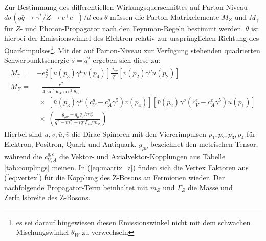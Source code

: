 Zur Bestimmung des differentiellen Wirkungsquerschnittes auf Parton-Niveau
\linebreak
\mbox{$d\sigma(q\bar q \rightarrow \gamma^*/Z \rightarrow e^+e^-)/d\cos\theta$}
müssen die Parton-Matrixelemente $M_Z$ und $M_\gamma$ für $Z$- und
Photon-Propagator nach den Feynman-Regeln bestimmt werden. $\theta$ ist hierbei
der Emissionswinkel des Elektron relativ zur ursprünglichen Richtung des
Quarkimpulses\footnote{es sei darauf hingewiesen diesen Emissionswinkel nicht
mit dem schwachen Mischungswinkel $\theta_W$ zu verwechseln}. Mit der auf
Parton-Niveau zur Verfügung stehenden quadrierten Schwerpunktsenergie
$\hat s=q^2$ ergeben sich diese zu:
\begin{align}
    M_\gamma = &-e_q^2
                \left[ \bar u(p_3) \gamma^\mu v(p_4) \right]
                \frac{g_{\mu\nu}}{q^2}
                \left[ \bar v(p_2) \gamma^\nu u(p_2) \right]
                \label{eq:matrix_gamma} \\[5pt]
    M_Z      = &-\frac{e^2}{4\sin^2\theta_W\cos^2\theta_W}
                \nonumber \\[3pt] &\;\times\;
                \left[ \bar u(p_3)\gamma^\mu(c_V^q-c_A^q\gamma^5)v(p_4)\right]
                \left[ \bar v(p_2)\gamma^\nu(c_V^e-c_A^e\gamma^5)u(p_1)\right]
                \label{eq:matrix_z} \\[2pt] &\;\times\;
                \left( \frac{g_{\mu\nu} - q_\mu q_\nu/m_Z^2}{q^2 - m_Z^2 +iq^2
                \Gamma_Z/m_Z}  \right) \nonumber
\end{align}
Hierbei sind $u,v,\bar u, \bar v$ die Dirac-Spinoren mit den Viererimpulsen
$p_1,p_2,p_3,p_4$ für Elektron, Positron, Quark und Antiquark. $g_{\mu\nu}$
bezeichnet den metrischen Tensor, während die $c_{V,A}^{q,e}$ die Vektor- und
Axialvektor-Kopplungen aus Tabelle \ref{tab:couplings} meinen. In
(\ref{eq:matrix_z}) finden sich die Vertex Faktoren aus (\ref{eq:vertex}) für
die Kopplung des Z-Bosons an Fermionen wieder. Der nachfolgende Propagator-Term
beinhaltet mit $m_Z$ und $\Gamma_Z$ die Masse und Zerfallsbreite des Z-Bosons.

